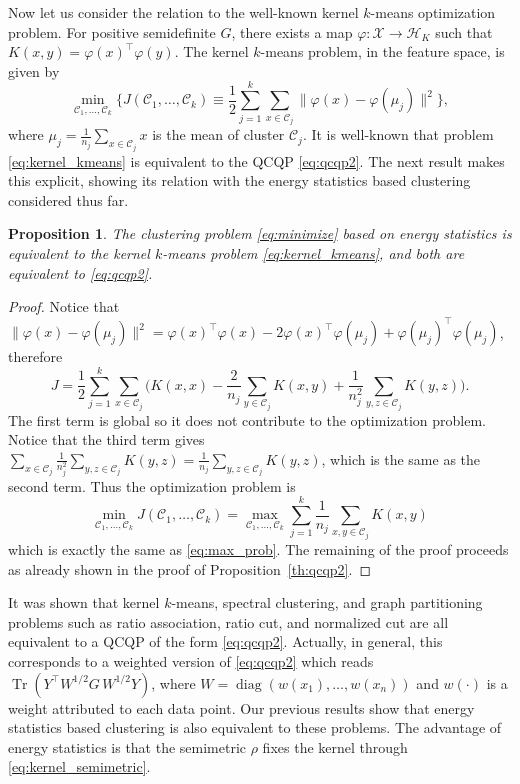 \documentclass[aps,preprint,nofootinbib,floatfix]{revtex4-1}
\newtheorem{proposition}[theorem]{Proposition}
\DeclareMathOperator{\diag}{diag}
\DeclareMathOperator{\Tr}{Tr}
\newcommand\kk{K}
\newcommand\HH{\mathcal{H}}
\newcommand\C{{\mathcal{C}}}
\begin{document}
Now let us consider the relation to the well-known kernel $k$-means 
optimization problem.
For positive semidefinite $G$, there exists a map
$\varphi: \mathcal{X} \to \HH_\kk$ such that
$\kk(x,y) = \varphi(x)^\top \varphi(y)$. The kernel $k$-means problem,
in the feature space,
is given by
\begin{equation}
\label{eq:kernel_kmeans}
\min_{\C_1,\dotsc,\C_k}\bigg\{ 
J(\C_1,\dots,\C_k) \equiv \dfrac{1}{2} \sum_{j=1}^k
\sum_{x \in \C_j} \| \varphi(x) - \varphi(\mu_j) \|^2
\bigg\},
\end{equation}
where $\mu_j = \tfrac{1}{n_j} \sum_{x \in \C_j} x$ is the  mean of cluster
$\C_j$.
It is well-known \cite{Dhillon} that problem \eqref{eq:kernel_kmeans} 
is equivalent to the QCQP
\eqref{eq:qcqp2}. The next result makes this explicit, showing its
relation with the energy statistics based clustering considered thus far.

\begin{proposition}
\label{th:kernel_kmeans}
The clustering problem
\eqref{eq:minimize} based on energy statistics 
is equivalent to the kernel $k$-means problem
\eqref{eq:kernel_kmeans}, and both are equivalent to \eqref{eq:qcqp2}.
\end{proposition}
\begin{proof}
Notice that $\| \varphi(x) - \varphi(\mu_j) \|^2 = \varphi(x)^\top \varphi(x)
- 2 \varphi(x)^\top \varphi(\mu_j) + \varphi(\mu_j)^\top \varphi(\mu_j)$,
therefore
\begin{equation}
\label{eq:J}
J = \dfrac{1}{2} \sum_{j=1}^k \sum_{x\in\C_j} \bigg(
\kk(x,x) - 
\dfrac{2}{n_j} \sum_{y\in \C_j} \kk(x,y) + \dfrac{1}{n_j^2}
\sum_{y,z \in \C_j} \kk(y,z) \bigg).
\end{equation}
The first term is global so it does not contribute to the optimization
problem. Notice that the third term gives
$\sum_{x\in\C_j} \tfrac{1}{n_j^2} \sum_{y,z\in\C_j} \kk(y,z) =
\tfrac{1}{n_j}\sum_{y,z\in\C_j} \kk(y,z)$, which is the same as
the second term. Thus the optimization problem is
\begin{equation}
\min_{\C_1,\dotsc,\C_k} J(\C_1,\dotsc,\C_k) = \max_{\C_1,\dotsc,\C_k}
\sum_{j=1}^k \dfrac{1}{n_j} \sum_{x,y \in\C_j} \kk(x,y)
\end{equation}
which is exactly the same as 
\eqref{eq:max_prob}. The remaining of the proof proceeds as 
already shown in the proof of Proposition~\ref{th:qcqp2}.
\end{proof}

It was shown \cite{Dhillon} that kernel $k$-means, spectral clustering,
and graph partitioning problems such as ratio association, ratio cut, and
normalized cut are all equivalent to a QCQP of the form \eqref{eq:qcqp2}.
Actually, in general, 
this corresponds to a weighted version of \eqref{eq:qcqp2} which reads
$ \Tr \left( Y^\top W^{1/2} G \, W^{1/2} Y \right)$, where 
$W = 
\diag(w(x_1),\dotsc, w(x_n))$ and $w(\cdot)$ is a
weight attributed to each data point. Our previous 
results show that energy statistics
based clustering is also equivalent to these problems. The advantage
of energy statistics is that the semimetric $\rho$ fixes the kernel
through \eqref{eq:kernel_semimetric}.
\end{document}
